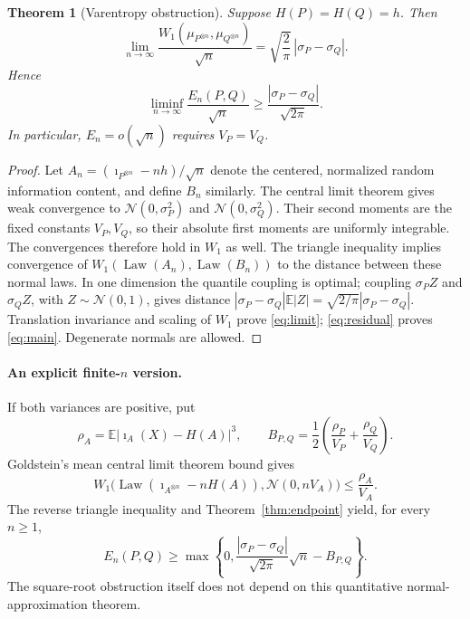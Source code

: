 \documentclass[11pt,a4paper]{article}
\newtheorem{theorem}{Theorem}
\newcommand{\E}{\mathbb E}
\newcommand{\Law}{\operatorname{Law}}
\newcommand{\ii}{\imath}
\newcommand{\N}{\mathcal N}
\begin{document}
\begin{theorem}[Varentropy obstruction]\label{thm:variance}
Suppose $H(P)=H(Q)=h$. Then
\begin{equation}\label{eq:limit}
\lim_{n\to\infty}
\frac{W_1(\mu_{P^{\otimes n}},\mu_{Q^{\otimes n}})}{\sqrt n}
=\sqrt{\frac2\pi}\,|\sigma_P-\sigma_Q|.
\end{equation}
Hence
\begin{equation}\label{eq:main}
\boxed{\displaystyle
\liminf_{n\to\infty}\frac{E_n(P,Q)}{\sqrt n}
\ge \frac{|\sigma_P-\sigma_Q|}{\sqrt{2\pi}}.}
\end{equation}
In particular, $E_n=o(\sqrt n)$ requires $V_P=V_Q$.
\end{theorem}
\begin{proof}
Let $A_n=(\ii_{P^{\otimes n}}-nh)/\sqrt n$ denote the centered,
normalized random information content, and define $B_n$ similarly.
The central limit theorem gives weak convergence to
$\N(0,\sigma_P^2)$ and $\N(0,\sigma_Q^2)$. Their second moments are
the fixed constants $V_P,V_Q$, so their absolute first moments are uniformly
integrable. The convergences therefore hold in $W_1$ as well.
The triangle inequality implies convergence of $W_1(\Law(A_n),\Law(B_n))$
to the distance between these normal laws. In one dimension the quantile
coupling is optimal; coupling $\sigma_P Z$ and $\sigma_Q Z$, with
$Z\sim\N(0,1)$, gives distance
$|\sigma_P-\sigma_Q|\E|Z|=\sqrt{2/\pi}|\sigma_P-\sigma_Q|$.
Translation invariance and scaling of $W_1$ prove \eqref{eq:limit};
\eqref{eq:residual} proves \eqref{eq:main}. Degenerate normals are allowed.
\end{proof}

\paragraph{An explicit finite-$n$ version.}
If both variances are positive, put
\[
\rho_A=\E|\ii_A(X)-H(A)|^3,\qquad
B_{P,Q}=\frac12\left(\frac{\rho_P}{V_P}+\frac{\rho_Q}{V_Q}\right).
\]
Goldstein's mean central limit theorem bound \cite{goldstein} gives
\begin{equation}\label{eq:goldstein}
W_1\bigl(\Law(\ii_{A^{\otimes n}}-nH(A)),\N(0,nV_A)\bigr)
\le \frac{\rho_A}{V_A}.
\end{equation}
The reverse triangle inequality and Theorem~\ref{thm:endpoint} yield, for
every $n\ge1$,
\begin{equation}\label{eq:finite}
E_n(P,Q)\ge
\max\left\{0,\frac{|\sigma_P-\sigma_Q|}{\sqrt{2\pi}}\sqrt n-B_{P,Q}\right\}.
\end{equation}
The square-root obstruction itself does not depend on this quantitative
normal-approximation theorem.
\end{document}
